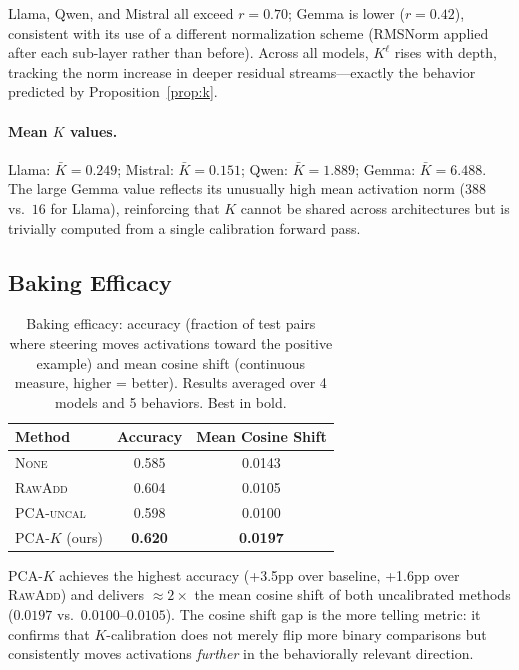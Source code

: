\documentclass{article}
\begin{document}
Llama, Qwen, and Mistral all exceed $r = 0.70$; Gemma is lower ($r = 0.42$),
consistent with its use of a different normalization scheme (RMSNorm applied after each
sub-layer rather than before).
Across all models, $K^\ell$ rises with depth, tracking the norm increase in deeper
residual streams—exactly the behavior predicted by Proposition~\ref{prop:k}.

\paragraph{Mean $K$ values.}
Llama: $\bar{K} = 0.249$; Mistral: $\bar{K} = 0.151$; Qwen: $\bar{K} = 1.889$;
Gemma: $\bar{K} = 6.488$.
The large Gemma value reflects its unusually high mean activation norm ($388$ vs.\ $16$
for Llama), reinforcing that $K$ cannot be shared across architectures but is trivially
computed from a single calibration forward pass.

\subsection{Baking Efficacy}
\label{sec:exp_efficacy}

\begin{table}[t]
\centering
\caption{Baking efficacy: accuracy (fraction of test pairs where steering moves
activations toward the positive example) and mean cosine shift (continuous measure,
higher = better). Results averaged over 4 models and 5 behaviors.
Best in bold.}
\label{tab:efficacy}
\begin{tabular}{lcc}
\toprule
Method & Accuracy & Mean Cosine Shift \\
\midrule
\textsc{None}         & 0.585 & 0.0143 \\
\textsc{RawAdd}       & 0.604 & 0.0105 \\
\textsc{PCA-uncal}    & 0.598 & 0.0100 \\
\textsc{PCA-$K$} (ours) & \textbf{0.620} & \textbf{0.0197} \\
\bottomrule
\end{tabular}
\end{table}

\textsc{PCA-$K$} achieves the highest accuracy (+3.5pp over baseline, +1.6pp over
\textsc{RawAdd}) and delivers ${\approx}2\times$ the mean cosine shift of both uncalibrated
methods ($0.0197$ vs.\ $0.0100$--$0.0105$).
The cosine shift gap is the more telling metric: it confirms that $K$-calibration does
not merely flip more binary comparisons but consistently moves activations
\emph{further} in the behaviorally relevant direction.
\end{document}
